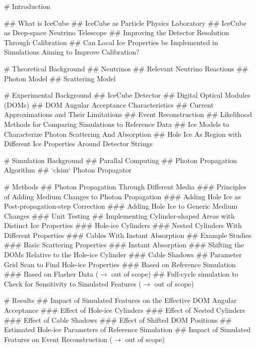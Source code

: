 
\tableofcontents

# Introduction

## What is IceCube
## IceCube as Particle Physics Laboratory
## IceCube as Deep-space Neutrino Telescope
## Improving the Detector Resolution Through Calibration
## Can Local Ice Properties be Implemented in Simulations Aiming to Improve Calibration?

# Theoretical Background
## Neutrinos
## Relevant Neutrino Reactions
## Photon Model
## Scattering Model

# Experimental Background
## IceCube Detector
## Digital Optical Modules (DOMs)
## DOM Angular Acceptance Characteristics
## Current Approximations and Their Limitations
## Event Reconstruction
## Likelihood Methods for Comparing Simulations to Reference Data
## Ice Models to Characterize Photon Scattering And Absorption
## Hole Ice As Region with Different Ice Properties Around Detector Strings

# Simulation Background
## Parallal Computing
## Photon Propagation Algorithm
## `clsim` Photon Propagator

# Methods
## Photon Propagation Through Different Media
### Principles of Adding Medium Changes to Photon Propagation
### Adding Hole Ice as Post-propagation-step Correction
### Adding Hole Ice to Generic Medium Changes
### Unit Testing
## Implementing Cylinder-shaped Areas with Distinct Ice Properties
### Hole-ice Cylinders
### Nested Cylinders With Different Properties
### Cables With Instant Absorption
## Example Studies
### Basic Scattering Properties
### Instant Absorption
### Shifting the DOMs Relative to the Hole-ice Cylinder
### Cable Shadows
## Parameter Grid Scan to Find Hole-ice Properties
### Based on Reference Simulation
### Based on Flasher Data ($\rightarrow$ out of scope)
## Full-cycle simulation to Check for Sensitivity to Simulated Features ($\rightarrow$ out of scope)

# Results
## Impact of Simulated Features on the Effective DOM Angular Acceptance
### Effect of Hole-ice Cylinders
### Effect of Nested Cylinders
### Effect of Cable Shadows
### Effect of Shifted DOM Positions
## Estimated Hole-ice Parameters of Reference Simulation
## Impact of Simulated Features on Event Reconstruction ($\rightarrow$ out of scope)

